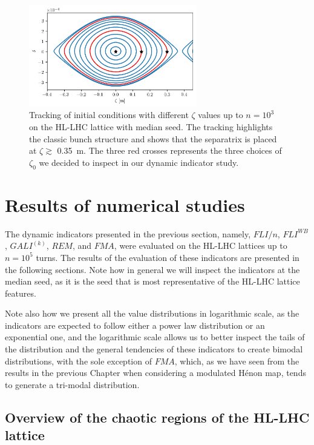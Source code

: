 \begin{figure}
    \centering
    \includegraphics[width=0.65\textwidth]{6_lhc_dynamic_indicators/figs/longitudinal.png}
    \caption{Tracking of initial conditions with different $\zeta$ values up to $n=10^3$ on the HL-LHC lattice with median seed. The tracking highlights the classic bunch structure and shows that the separatrix is placed at $\zeta \gtrsim$ \SI{0.35}{\meter}. The three red crosses represents the three choices of $\zeta_0$ we decided to inspect in our dynamic indicator study.}
    \label{fig:the_bunch}
\end{figure}

\section{Results of numerical studies} \label{sec:results}

The dynamic indicators presented in the previous section, namely, $FLI/n$, $FLI^{WB}$, $GALI^{(k)}$, $REM$, and $FMA$, were evaluated on the HL-LHC lattices up to $n=10^5$ turns. The results of the evaluation of these indicators are presented in the following sections. Note how in general we will inspect the indicators at the median seed, as it is the seed that is most representative of the HL-LHC lattice features.

Note also how we present all the value distributions in logarithmic scale, as the indicators are expected to follow either a power law distribution or an exponential one, and the logarithmic scale allows us to better inspect the tails of the distribution and the general tendencies of these indicators to create bimodal distributions, with the sole exception of $FMA$, which, as we have seen from the results in the previous Chapter when considering a modulated Hénon map, tends to generate a tri-modal distribution.


\subsection{Overview of the chaotic regions of the HL-LHC lattice}

